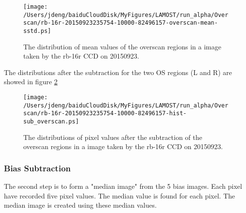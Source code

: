 \documentclass[12pt,twoside,letterpaper]{article}
\begin{document}
   \begin{figure}[!htbp]
   \begin{center}
       \texttt{[image: /Users/jdeng/baiduCloudDisk/MyFigures/LAMOST/run\_alpha/Overscan/rb-16r-20150923235754-10000-82496157-overscan-mean-sstd.ps]}
       \caption{The distribution of mean values of the overscan regions in a image taken by the rb-16r CCD on 20150923.}
       \label{Fig:PV_OS_mean_sstd_rb_16r}
   \end{center}    
   \end{figure}

The distributions after the subtraction for the two OS regions (L and
R) are showed in figure \ref{Fig:sub_OS_rb_16r}

   \begin{figure}[!htbp]
   \begin{center}
       \texttt{[image: /Users/jdeng/baiduCloudDisk/MyFigures/LAMOST/run\_alpha/Overscan/rb-16r-20150923235754-10000-82496157-hist-sub\_overscan.ps]}
       \caption{The distributions of pixel values after the subtraction of the overscan regions in a image taken by the rb-16r CCD on 20150923.}
       \label{Fig:sub_OS_rb_16r}
   \end{center}    
   \end{figure}


\subsubsection{Bias Subtraction}\label{sec:biasSub}

The second step is to form a "median image" from the 5 bias images.
Each pixel have recorded five pixel values. The median value is
found for each pixel. The median image is created using these median 
values. 
\end{document}
